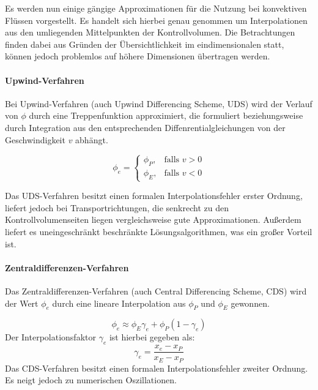 Es werden nun einige gängige Approximationen für die Nutzung bei konvektiven Flüssen vorgestellt.
Es handelt sich hierbei genau genommen um Interpolationen aus den umliegenden Mittelpunkten der Kontrollvolumen.
Die Betrachtungen finden dabei aus Gründen der Übersichtlichkeit im eindimensionalen statt,
können jedoch problemlos auf höhere Dimensionen übertragen werden.

\paragraph{Upwind-Verfahren}
Bei Upwind-Verfahren (auch Upwind Differencing Scheme, UDS) wird der Verlauf von $\phi$ durch eine Treppenfunktion approximiert, die formuliert
beziehungsweise durch Integration aus den entsprechenden Diffenrentialgleichungen 
von der Geschwindigkeit $v$ abhängt.

\begin{equation*}
\phi_e=\left\{\begin{array}{cl} \phi_P, & \mbox{falls }v>0\\
\phi_E, & \mbox{falls } v<0\end{array}\right.
\end{equation*}

Das UDS-Verfahren besitzt einen formalen Interpolationsfehler erster Ordnung, liefert jedoch bei
Transport\-richt\-ung\-en, die senkrecht zu den Kontrollvolumenseiten liegen vergleichsweise gute Approximationen.
Außerdem liefert es uneingeschränkt beschränkte Lösungsalgorithmen, was ein großer Vorteil ist.




\paragraph{Zentraldifferenzen-Verfahren}
Das Zentraldifferenzen-Verfahren (auch Central Differencing Scheme, CDS) wird der
Wert $\phi_e$ durch eine lineare Interpolation aus $\phi_P$ und $\phi_E$ gewonnen.

\begin{equation*}
  \phi_e \approx \phi_E\gamma_e + \phi_P (1-\gamma_e)
\end{equation*}
Der Interpolationsfaktor $\gamma_e$ ist hierbei gegeben als:
\begin{equation}
  \gamma_e = \frac{x_e-x_P}{x_E-x_P}
  \label{eq:cds_faktor}
\end{equation}
Das CDS-Verfahren besitzt einen formalen Interpolationsfehler zweiter Ordnung. Es neigt jedoch zu
numerischen Oszillationen.

